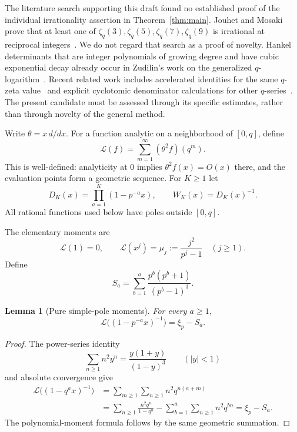\documentclass[11pt]{article}
\newtheorem{lemma}[theorem]{Lemma}
\theoremstyle{remark}
\newcommand{\Lcal}{\mathcal L}
\begin{document}
The literature search supporting this draft found no established proof
of the individual irrationality assertion in Theorem~\ref{thm:main}.
Jouhet and Mosaki prove that at least one of
$\zeta_q(3),\zeta_q(5),\zeta_q(7),\zeta_q(9)$ is irrational at reciprocal
integers~\cite{JM}. We do not regard that search as a proof of novelty.
Hankel determinants that are integer polynomials of growing degree and
have cubic exponential decay already occur in Zudilin's work on the
generalized $q$-logarithm~\cite{Zudilin2016}. Recent related work includes
accelerated identities for the same $q$-zeta value~\cite{Tauraso} and
explicit cyclotomic denominator calculations for other
$q$-series~\cite{KY}. The present candidate must be assessed through its
specific estimates, rather than through novelty of the general method.

Write $\theta=x\,d/dx$. For a function analytic on a neighborhood of
$[0,q]$, define
\begin{equation}\label{eq:functional}
 \Lcal(f)=\sum_{m=1}^{\infty}(\theta^2f)(q^m).
\end{equation}
This is well-defined: analyticity at $0$ implies
$\theta^2f(x)=O(x)$ there, and the evaluation points form a geometric
sequence. For $K\ge1$ let
\begin{equation}\label{eq:denom}
 D_K(x)=\prod_{a=1}^K(1-p^{-a}x),\qquad W_K(x)=D_K(x)^{-1}.
\end{equation}
All rational functions used below have poles outside $[0,q]$.

The elementary moments are
\begin{equation}\label{eq:poly-moments}
 \Lcal(1)=0,\qquad
 \Lcal(x^j)=\mu_j:=\frac{j^2}{p^j-1}\quad(j\ge1).
\end{equation}
Define
\begin{equation}\label{eq:Sa}
 S_a=\sum_{b=1}^a\frac{p^b(p^b+1)}{(p^b-1)^3}.
\end{equation}

\begin{lemma}[Pure simple-pole moments]\label{lem:purity}
For every $a\ge1$,
\[
 \Lcal\bigl((1-p^{-a}x)^{-1}\bigr)=\xi_p-S_a.
\]
\end{lemma}
\begin{proof}
The power-series identity
\[
 \sum_{n\ge1}n^2y^n=\frac{y(1+y)}{(1-y)^3}\qquad(|y|<1)
\]
and absolute convergence give
\begin{align*}
 \Lcal\bigl((1-q^a x)^{-1}\bigr)
 &=\sum_{m\ge1}\sum_{n\ge1}n^2q^{n(a+m)}\\
 &=\sum_{n\ge1}\frac{n^2q^n}{1-q^n}
   -\sum_{b=1}^a\sum_{n\ge1}n^2q^{bn}
 =\xi_p-S_a.
\end{align*}
The polynomial-moment formula follows by the same geometric summation.
\end{proof}
\end{document}
